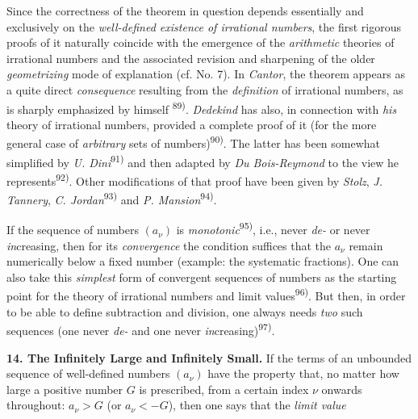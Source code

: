 \thispagestyle{fancy}

\vspace{0.5cm}

Since the correctness of the theorem in question depends essentially and exclusively on the \textit{well-defined existence of irrational numbers}, the first rigorous proofs of it naturally coincide with the emergence of the \textit{arithmetic} theories of irrational numbers and the associated revision and sharpening of the older \textit{geometrizing} mode of explanation (cf. No. 7). In \textit{Cantor}, the theorem appears as a quite direct \textit{consequence} resulting from the \textit{definition} of irrational numbers, as is sharply emphasized by himself \textsuperscript{89)}. \textit{Dedekind} has also, in connection with \textit{his} theory of irrational numbers, provided a complete proof of it (for the more general case of \textit{arbitrary} sets of numbers)\textsuperscript{90)}. The latter has been somewhat simplified by \textit{U. Dini}\textsuperscript{91)} and then adapted by \textit{Du Bois-Reymond} to the view he represents\textsuperscript{92)}. Other modifications of that proof have been given by \textit{Stolz}, \textit{J. Tannery}, \textit{C. Jordan}\textsuperscript{93)} and \textit{P. Mansion}\textsuperscript{94)}.

If the sequence of numbers $(a_\nu)$ is \textit{monotonic}\textsuperscript{95)}, i.e., never \textit{de-} or never \textit{in}creasing, then for its \textit{convergence} the condition suffices that the $a_\nu$ remain numerically below a fixed number (example: the systematic fractions). One can also take this \textit{simplest} form of convergent sequences of numbers as the starting point for the theory of irrational numbers and limit values\textsuperscript{96)}. But then, in order to be able to define subtraction and division, one always needs \textit{two} such sequences (one never \textit{de-} and one never \textit{in}creasing)\textsuperscript{97)}.

\vspace{0.1cm}

\textbf{14. The Infinitely Large and Infinitely Small.} If the terms of an unbounded sequence of well-defined numbers $(a_\nu)$ have the property that, no matter how large a positive number $G$ is prescribed, from a certain index $\nu$ onwards throughout: $a_\nu > G$ (or $a_\nu < -G$), then one says that the \textit{limit value}

